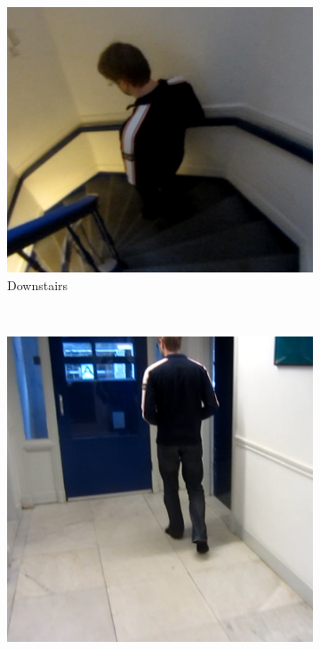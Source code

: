 \begin{figure}
  \centering
  \begin{subfigure}[b]{0.3\textwidth}
    \includegraphics[width=\textwidth]{./Figures/chapter6/data_collection/stills/marc_downstairs.png}
    \caption{Downstairs}
    \label{fig:stills_subject_3_downstairs}
  \end{subfigure}%
  ~
  \begin{subfigure}[b]{0.3\textwidth}
    \includegraphics[width=\textwidth]{./Figures/chapter6/data_collection/stills/marc_walk.png}

\end{subfigure}
\end{figure}
